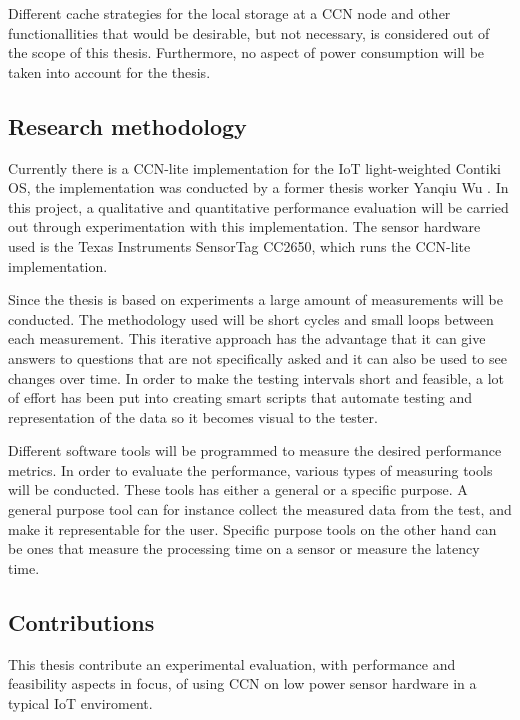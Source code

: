 Different cache strategies for the local storage at a CCN node and other functionallities that would be desirable, but not necessary, is considered out of the scope of this thesis. Furthermore, no aspect of power consumption will be taken into account for the thesis.

\subsection{Research methodology}
Currently there is a  CCN-lite implementation for the IoT light-weighted Contiki OS, the implementation was conducted by a former thesis worker Yanqiu Wu \cite{yanqui}. In this project, a qualitative and quantitative performance evaluation will be carried out through experimentation with this implementation. The sensor hardware used is the Texas Instruments SensorTag CC2650, which runs the CCN-lite implementation. 

Since the thesis is based on experiments a large amount of measurements will be conducted. The methodology used will be short cycles and small loops between each measurement. This iterative approach has the advantage that it can give answers to questions that are not specifically asked and it can also be used to see changes over time. 
In order to make the testing intervals short and feasible, a lot of effort has been put into creating smart scripts that automate testing and representation of the data so it becomes visual to the tester. 

Different software tools will be programmed to measure the desired performance metrics. 
In order to evaluate the performance, various types of measuring tools will be conducted. These tools has either a general or a specific purpose. A general purpose tool can for instance collect the measured data from the test, and make it representable for the user. Specific purpose tools on the other hand can be ones that measure the processing time on a sensor or measure the latency time. 

\subsection{Contributions}

This thesis contribute an experimental evaluation, with performance and feasibility aspects in focus, of using CCN on low power sensor hardware in a typical IoT enviroment.

